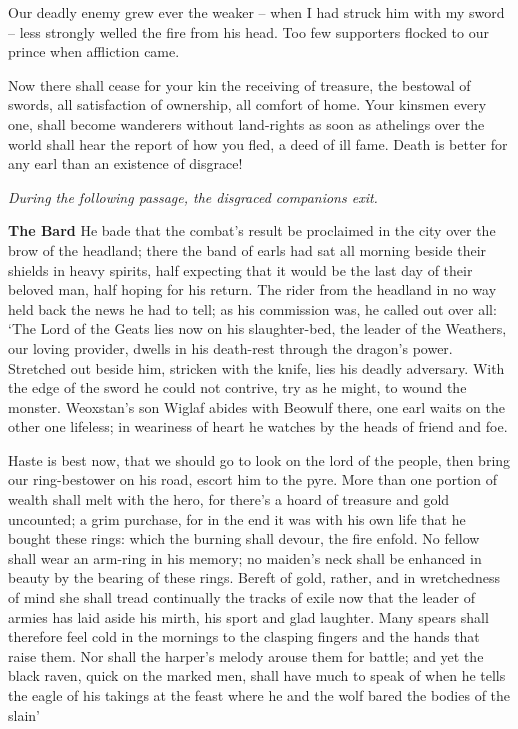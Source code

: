 \documentclass[a4paper]{article}
\begin{document}
{Our deadly enemy grew ever the weaker –
when I had struck him with my sword – less strongly welled
the fire from his head. Too few supporters
flocked to our prince when affliction came.

Now there shall cease for your kin the receiving of treasure,
the bestowal of swords, all satisfaction of ownership,
all comfort of home. Your kinsmen every one,
shall become wanderers without land-rights
as soon as athelings over the world
shall hear the report of how you fled,
a deed of ill fame. Death is better
for any earl than an existence of disgrace!

\centerline{\textit{During the following passage, the disgraced companions exit.}}

\textbf{The Bard} He bade that the combat’s result be proclaimed in the city
over the brow of the headland; there the band of earls
had sat all morning beside their shields
in heavy spirits, half expecting
that it would be the last day of their beloved man,
half hoping for his return. The rider from the headland
in no way held back the news he had to tell;
as his commission was, he called out over all:
‘The Lord of the Geats lies now on his slaughter-bed,
the leader of the Weathers, our loving provider,
dwells in his death-rest through the dragon’s power.
Stretched out beside him, stricken with the knife,
lies his deadly adversary. With the edge of the sword
he could not contrive, try as he might,
to wound the monster. Weoxstan’s son
Wiglaf abides with Beowulf there,
one earl waits on the other one lifeless;
in weariness of heart he watches by the heads
of friend and foe.

Haste is best now,
that we should go to look on the lord of the people,
then bring our ring-bestower on his road,
escort him to the pyre. More than one portion of wealth
shall melt with the hero, for there’s a hoard of treasure
and gold uncounted; a grim purchase,
for in the end it was with his own life
that he bought these rings: which the burning shall devour,
the fire enfold. No fellow shall wear
an arm-ring in his memory; no maiden’s neck
shall be enhanced in beauty by the bearing of these rings.
Bereft of gold, rather, and in wretchedness of mind
she shall tread continually the tracks of exile
now that the leader of armies has laid aside his mirth,
his sport and glad laughter. Many spears shall therefore
feel cold in the mornings to the clasping fingers
and the hands that raise them. Nor shall the harper’s melody
arouse them for battle; and yet the black raven,
quick on the marked men, shall have much to speak of
when he tells the eagle of his takings at the feast
where he and the wolf bared the bodies of the slain’

}
\end{document}
